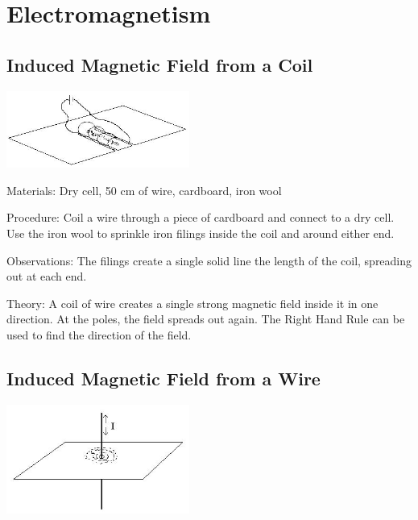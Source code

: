 \section{Electromagnetism}

\begin{multicols}{2}


\subsection{Induced Magnetic Field from a Coil}

\begin{center}
\includegraphics[width=0.45\textwidth]{./img/induced-mag-field-coil.png}
\end{center}

\begin{description*}
\item[Materials:]{Dry cell, 50 cm of wire, cardboard, iron wool}
\item[Procedure:]{Coil a wire through a piece of cardboard and connect to a dry cell. Use the iron wool to sprinkle iron filings inside the coil and around either end.}
\item[Observations:]{The filings create a single solid line the length of the coil, spreading out at each end.}
\item[Theory:]{A coil of wire creates a single strong magnetic field inside it in one direction. At the poles, the field spreads out again. The Right Hand Rule can be used to find the direction of the field.}
\end{description*}

\subsection{Induced Magnetic Field from a Wire}

\begin{center}
\includegraphics[width=0.45\textwidth]{./img/induced-mag-field-wire.png}
\end{center}


\end{multicols}

